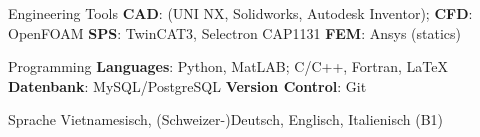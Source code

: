 

\begin{cvskills}


  \cvskill
    {Engineering Tools} %
    {\textbf{CAD}: (UNI NX, Solidworks, Autodesk Inventor); 
    \newline \textbf{CFD}: OpenFOAM
    \newline \textbf{SPS}: TwinCAT3, Selectron CAP1131
	\newline \textbf{FEM}: Ansys (statics)\smallskip} %

%

  \cvskill
    {Programming} %
    {\textbf{Languages}: Python, MatLAB; C/C++, Fortran, LaTeX 
    	\newline \textbf{Datenbank}: MySQL/PostgreSQL
    	\newline \textbf{Version Control}: Git
    	} %


  \cvskill
    {Sprache} %
    {Vietnamesisch, (Schweizer-)Deutsch, Englisch, Italienisch (B1)} %

\end{cvskills}

